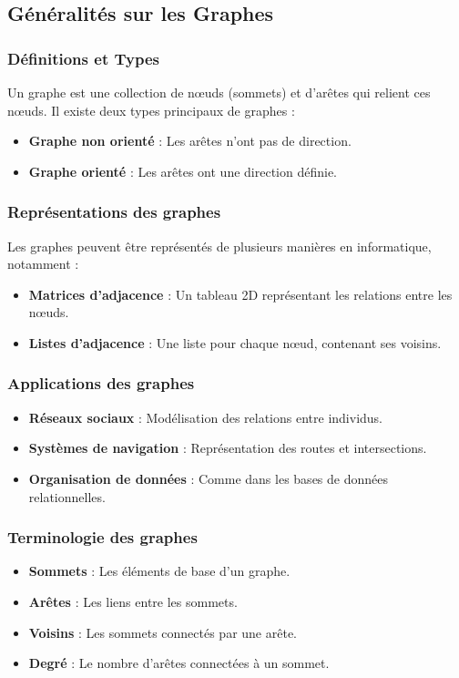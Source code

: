 \subsection{Généralités sur les Graphes}\label{subsec:generalites-sur-les-graphes}

\subsubsection{Définitions et Types}
Un graphe est une collection de nœuds (sommets) et d'arêtes qui relient ces nœuds.
Il existe deux types principaux de graphes :
\begin{itemize}
    \item \textbf{Graphe non orienté} : Les arêtes n'ont pas de direction.
    \item \textbf{Graphe orienté} : Les arêtes ont une direction définie.
\end{itemize}

\subsubsection{Représentations des graphes}
Les graphes peuvent être représentés de plusieurs manières en informatique, notamment :
\begin{itemize}
    \item \textbf{Matrices d'adjacence} : Un tableau 2D représentant les relations entre les nœuds.
    \item \textbf{Listes d'adjacence} : Une liste pour chaque nœud, contenant ses voisins.
\end{itemize}

\subsubsection{Applications des graphes}
\begin{itemize}
    \item \textbf{Réseaux sociaux} : Modélisation des relations entre individus.
    \item \textbf{Systèmes de navigation} : Représentation des routes et intersections.
    \item \textbf{Organisation de données} : Comme dans les bases de données relationnelles.
\end{itemize}

\subsubsection{Terminologie des graphes}
\begin{itemize}
    \item \textbf{Sommets} : Les éléments de base d'un graphe.
    \item \textbf{Arêtes} : Les liens entre les sommets.
    \item \textbf{Voisins} : Les sommets connectés par une arête.
    \item \textbf{Degré} : Le nombre d'arêtes connectées à un sommet.
\end{itemize}


